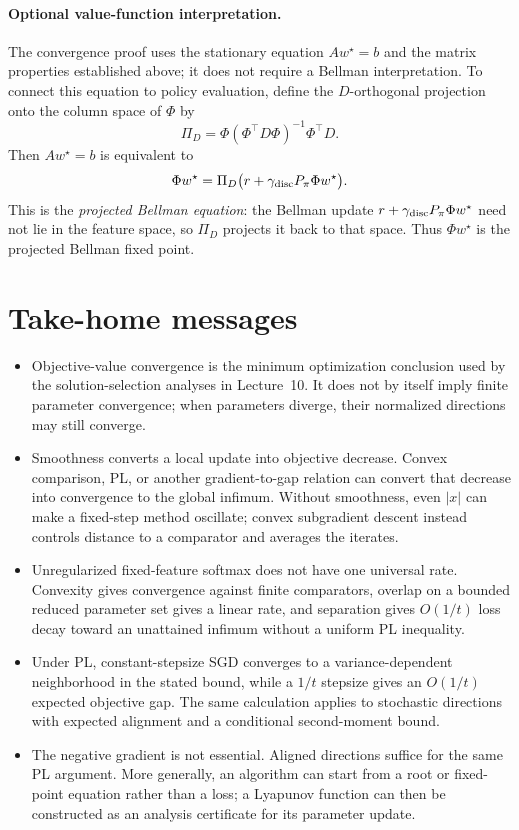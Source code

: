 \documentclass[11pt,twoside]{article}
\theoremstyle{definition}
\theoremstyle{remark}
\begin{document}
\paragraph{Optional value-function interpretation.}
The convergence proof uses the stationary equation $Aw^\star=b$ and the
matrix properties established above; it does not require a Bellman
interpretation. To connect this equation to policy evaluation, define the
$D$-orthogonal
projection onto the column space of $\Phi$ by
\[
 \Pi_D=\Phi(\Phi^\top D\Phi)^{-1}\Phi^\top D.
\]
Then $Aw^\star=b$ is equivalent to
\begin{equation}
 \Phi w^\star
 =\Pi_D\bigl(r+\gamma_{\rm disc}P_\pi\Phi w^\star\bigr).
 \label{eq:projected-bellman}
\end{equation}
This is the \emph{projected Bellman equation}: the Bellman update
$r+\gamma_{\rm disc}P_\pi\Phi w^\star$ need not lie in the feature space, so
$\Pi_D$ projects it back to that space. Thus $\Phi w^\star$ is the projected
Bellman fixed point.

\section{Take-home messages}
\label{sec:take-home}

\begin{itemize}[leftmargin=*]
\item Objective-value convergence is the minimum optimization conclusion used
by the solution-selection analyses in Lecture~10. It does not by itself imply
finite parameter convergence; when parameters diverge, their normalized
directions may still converge.
\item Smoothness converts a local update into objective decrease. Convex
comparison, PL, or another gradient-to-gap relation can convert that decrease
into convergence to the global infimum. Without smoothness, even $|x|$ can
make a fixed-step method oscillate; convex subgradient descent instead
controls distance to a comparator and averages the iterates.
\item Unregularized fixed-feature softmax does not have one universal rate.
Convexity gives convergence against finite comparators, overlap on a bounded
reduced parameter set gives a linear rate, and separation gives $O(1/t)$ loss decay toward an
unattained infimum without a uniform PL inequality.
\item Under PL, constant-stepsize SGD converges to a variance-dependent
neighborhood in the stated bound, while a $1/t$ stepsize gives an $O(1/t)$
expected objective gap. The same calculation applies to stochastic directions
with expected alignment and a conditional second-moment bound.
\item The negative gradient is not essential. Aligned directions suffice for
the same PL argument. More generally, an algorithm can start from a root or
fixed-point equation rather than a loss; a Lyapunov function can then be
constructed as an analysis certificate for its parameter update.
\end{itemize}
\end{document}
